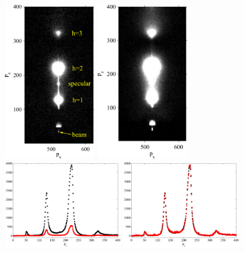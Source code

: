 \begin{figure}[jtbp]
  \centering
  \includegraphics[width=0.35\textwidth]{figures/ripple/MMs/laxs/olddopc045_labels}
  \includegraphics[width=0.35\textwidth]{figures/ripple/MMs/laxs/olddopc044}
  \includegraphics[width=0.45\textwidth]{figures/ripple/MMs/laxs/attenuator1}
  \includegraphics[width=0.45\textwidth]{figures/ripple/MMs/laxs/attenuator2}

\end{figure}

